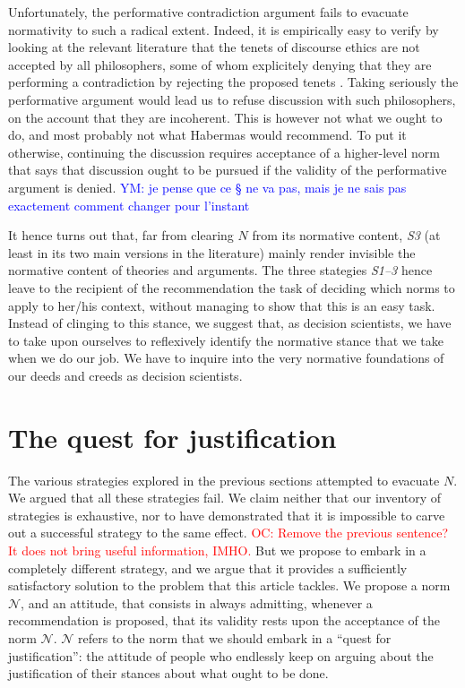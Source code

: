 \documentclass[preprint, french, english, 11pt, authoryear]{elsarticle}%
\newcommand{\commentYM}[1]{\textcolor{blue}{YM: #1}}
\newcommand{\commentOC}[1]{\textcolor{red}{OC: #1}}
\newcommand{\adv}{\mathscr{N}}
\begin{document}
Unfortunately, the performative contradiction argument fails to evacuate normativity to such a radical extent. Indeed, it is empirically easy to verify by looking at the relevant literature that the tenets of discourse ethics are not accepted by all philosophers, some of whom explicitely denying that they are performing a contradiction by rejecting the proposed tenets \citep{heath_communicative_2001}. Taking seriously the performative argument would lead us to refuse discussion with such philosophers, on the account that they are incoherent. This is however not what we ought to do, and most probably not what Habermas would recommend. To put it otherwise, continuing the discussion requires acceptance of a higher-level norm that says that discussion ought to be pursued if the validity of the performative argument is denied. \commentYM{je pense que ce § ne va pas, mais je ne sais pas exactement comment changer pour l'instant}

It hence turns out that, far from clearing $N$ from its normative content, \emph{S3} (at least in its two main versions in the literature) mainly render invisible the normative content of theories and arguments. The three stategies \emph{S1--3} hence leave to the recipient of the recommendation the task of deciding which norms to apply to her/his context, without managing to show that this is an easy task. 
Instead of clinging to this stance, we suggest that, as decision scientists, we have to take upon ourselves to reflexively identify the normative stance that we take when we do our job. We have to inquire into the very normative foundations of our deeds and creeds as decision scientists. 

\section{The quest for justification}
The various strategies explored in the previous sections attempted to evacuate $N$. We argued that all these strategies fail. We claim neither that our inventory of strategies is exhaustive, nor to have demonstrated that it is impossible to carve out a successful strategy to the same effect. \commentOC{Remove the previous sentence? It does not bring useful information, IMHO.} But we propose to embark in a completely different strategy, and we argue that it provides a sufficiently satisfactory solution to the problem that this article tackles. We propose a norm $\adv$, and an attitude, that consists in always admitting, whenever a recommendation is proposed, that its validity rests upon the acceptance of the norm $\adv$. $\adv$ refers to the norm that we should embark in a ``quest for justification'': the attitude of people who endlessly keep on arguing about the justification of their stances about what ought to be done.
\end{document}
